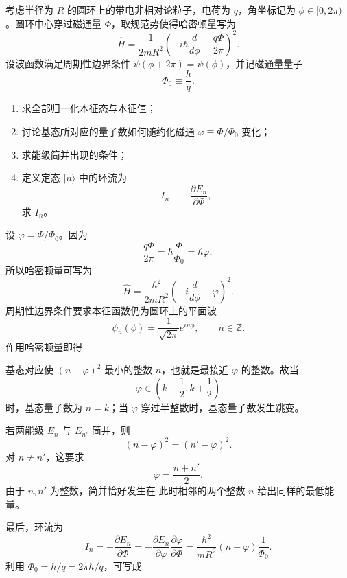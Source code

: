 ﻿

\begin{question}
考虑半径为 $R$ 的圆环上的带电非相对论粒子，电荷为 $q$，角坐标记为 $\phi\in[0,2\pi)$。圆环中心穿过磁通量 $\Phi$，取规范势使得哈密顿量写为
\[
\hat H=\frac{1}{2mR^2}\left(-i\hbar\frac{d}{d\phi}-\frac{q\Phi}{2\pi}\right)^2.
\]
设波函数满足周期性边界条件 $\psi(\phi+2\pi)=\psi(\phi)$，并记磁通量量子
\[
\Phi_0\equiv \frac{h}{q}.
\]

\begin{enumerate}[label=(\arabic*),leftmargin=2.5em]
  \item 求全部归一化本征态与本征值；
  \item 讨论基态所对应的量子数如何随约化磁通 $\varphi\equiv \Phi/\Phi_0$ 变化；
  \item 求能级简并出现的条件；
  \item 定义定态 $|n\rangle$ 中的环流为
  \[
  I_n\equiv -\frac{\partial E_n}{\partial \Phi},
  \]
  求 $I_n$。
\end{enumerate}

\begin{solution}
设 $\varphi=\Phi/\Phi_0$。因为
\[
\frac{q\Phi}{2\pi}=\hbar\frac{\Phi}{\Phi_0}=\hbar\varphi,
\]
所以哈密顿量可写为
\[
\hat H=\frac{\hbar^2}{2mR^2}\left(-i\frac{d}{d\phi}-\varphi\right)^2.
\]
周期性边界条件要求本征函数仍为圆环上的平面波
\[
\psi_n(\phi)=\frac{1}{\sqrt{2\pi}}e^{in\phi},\qquad n\in\mathbb Z.
\]
作用哈密顿量即得

基态对应使 $(n-\varphi)^2$ 最小的整数 $n$，也就是最接近 $\varphi$ 的整数。故当
\[
\varphi\in\left(k-\frac12,k+\frac12\right)
\]
时，基态量子数为 $n=k$；当 $\varphi$ 穿过半整数时，基态量子数发生跳变。

若两能级 $E_n$ 与 $E_{n'}$ 简并，则
\[
(n-\varphi)^2=(n'-\varphi)^2.
\]
对 $n\neq n'$，这要求
\[
\varphi=\frac{n+n'}{2}.
\]
由于 $n,n'$ 为整数，简并恰好发生在
此时相邻的两个整数 $n$ 给出同样的最低能量。

最后，环流为
\[
I_n=-\frac{\partial E_n}{\partial \Phi}
=-\frac{\partial E_n}{\partial \varphi}\frac{\partial \varphi}{\partial \Phi}
=\frac{\hbar^2}{mR^2}(n-\varphi)\frac{1}{\Phi_0}.
\]
利用 $\Phi_0=h/q=2\pi\hbar/q$，可写成
\end{solution}
\end{question}

